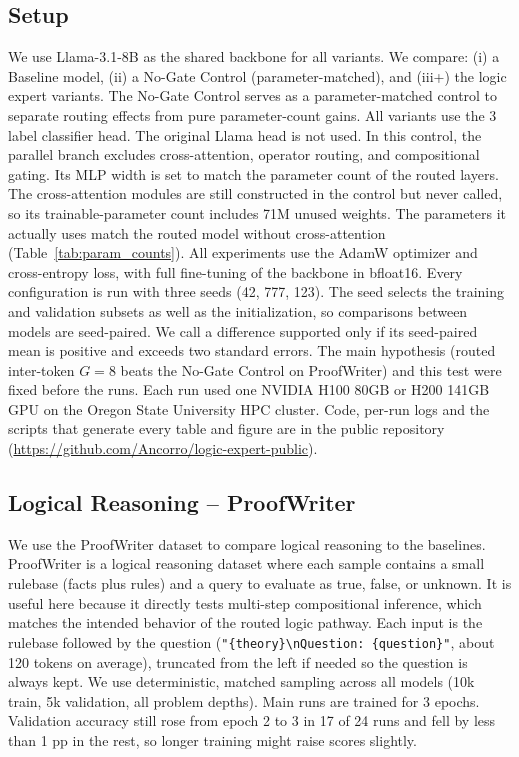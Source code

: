 \documentclass[10pt,twocolumn,letterpaper]{article}
\begin{document}
\subsection{Setup}
We use Llama-3.1-8B \cite{grattafiori2024llama3herdmodels}
as the shared backbone for all variants.
We compare: (i) a Baseline
model, (ii) a No-Gate Control (parameter-matched), and
(iii+) the logic expert variants. The No-Gate Control serves as a
parameter-matched control to separate routing effects from pure
parameter-count gains.
All variants use the 3 label classifier head.
The original Llama head is not used.
In this control, the parallel branch excludes cross-attention, operator
routing, and compositional gating. Its MLP width is set to match the parameter
count of the routed layers. The cross-attention modules are still constructed
in the control but never called, so its trainable-parameter count includes
71M unused weights. The parameters it actually uses match the routed model
without cross-attention (Table~\ref{tab:param_counts}). All experiments use the AdamW
\cite{loshchilov2019decoupledweightdecayregularization}
optimizer and cross-entropy loss, with full fine-tuning of the backbone in
bfloat16. Every configuration is run with three seeds (42, 777, 123). The seed
selects the training and validation subsets as well as the initialization, so
comparisons between models are seed-paired. We call a difference supported only
if its seed-paired mean is positive and exceeds two standard errors. The main
hypothesis (routed inter-token $G=8$ beats the No-Gate Control on ProofWriter)
and this test were fixed before the runs. Each run used one NVIDIA H100 80GB
or H200 141GB GPU on the Oregon State University HPC cluster. Code, per-run
logs and the scripts that generate every table and figure are in the public
repository (\url{https://github.com/Ancorro/logic-expert-public}).

\subsection{Logical Reasoning -- ProofWriter}
We use the ProofWriter \cite{tafjord2021proofwritergeneratingimplicationsproofs}
dataset to compare logical reasoning to the baselines.
ProofWriter is a logical reasoning dataset where each sample
contains a small rulebase (facts plus rules) and a query to evaluate as true,
false, or unknown. It is useful here because it directly tests multi-step
compositional inference, which matches the
intended behavior of the routed logic pathway.
Each input is the rulebase followed by the question
(\texttt{"\{theory\}\textbackslash nQuestion: \{question\}"}, about 120 tokens
on average), truncated from the left if needed so the question is always kept.
We use deterministic, matched sampling across all models
(10k train, 5k validation, all problem depths). Main runs are trained for 3
epochs. Validation accuracy still rose from epoch 2 to 3 in 17 of 24 runs and
fell by less than 1 pp in the rest, so longer training might raise scores
slightly.
\end{document}
